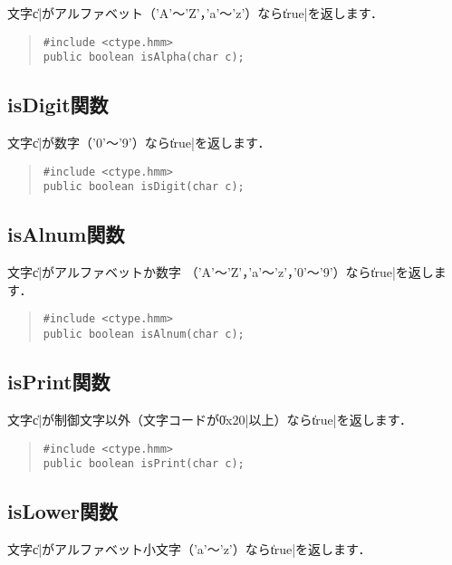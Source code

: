 文字\|c|がアルファベット（'A'〜'Z'，'a'〜'z'）なら\|true|を返します．

\begin{quote}
\begin{verbatim}
#include <ctype.hmm>
public boolean isAlpha(char c);
\end{verbatim}
\end{quote}

\subsection{isDigit関数}

文字\|c|が数字（'0'〜'9'）なら\|true|を返します．

\begin{quote}
\begin{verbatim}
#include <ctype.hmm>
public boolean isDigit(char c);
\end{verbatim}
\end{quote}

\subsection{isAlnum関数}

文字\|c|がアルファベットか数字
（'A'〜'Z'，'a'〜'z'，'0'〜'9'）なら\|true|を返します．

\begin{quote}
\begin{verbatim}
#include <ctype.hmm>
public boolean isAlnum(char c);
\end{verbatim}
\end{quote}

\subsection{isPrint関数}

文字\|c|が制御文字以外（文字コードが\|0x20|以上）なら\|true|を返します．

\begin{quote}
\begin{verbatim}
#include <ctype.hmm>
public boolean isPrint(char c);
\end{verbatim}
\end{quote}

\subsection{isLower関数}

文字\|c|がアルファベット小文字（'a'〜'z'）なら\|true|を返します．

